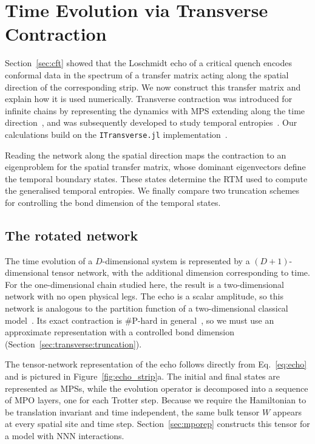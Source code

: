 \FloatBarrier
\section{Time Evolution via Transverse Contraction}
\label{sec:transverse}

Section~\ref{sec:cft} showed that the Loschmidt echo of a critical quench encodes conformal data in the spectrum of a transfer matrix acting along the spatial direction of the corresponding strip. We now construct this transfer matrix and explain how it is used numerically. Transverse contraction was introduced for infinite chains by representing the dynamics with \ac{MPS} extending along the time direction~\cite{banuls2009,muller_hermes2012}, and was subsequently developed to study temporal entropies~\cite{carignano_marimon_tagliacozzo2024,carignano_tagliacozzo2025}. Our calculations build on the \texttt{ITransverse.jl} implementation~\cite{carignano2025itransverse}.

Reading the network along the spatial direction maps the contraction to an eigenproblem for the spatial transfer matrix, whose dominant eigenvectors define the temporal boundary states. These states determine the \ac{RTM} used to compute the generalised temporal entropies. We finally compare two truncation schemes for controlling the bond dimension of the temporal states.

\subsection{The rotated network}
\label{sec:transverse:network}

The time evolution of a $D$-dimensional system is represented by a $(D{+}1)$-dimensional tensor network, with the additional dimension corresponding to time. For the one-dimensional chain studied here, the result is a two-dimensional network with no open physical legs. The echo is a scalar amplitude, so this network is analogous to the partition function of a two-dimensional classical model~\cite{fradkin2013}. Its exact contraction is \#P-hard in general~\cite{schuch2007}, so we must use an approximate representation with a controlled bond dimension (Section~\ref{sec:transverse:truncation}).

The tensor-network representation of the echo follows directly from Eq.~\eqref{eq:echo} and is pictured in Figure~\ref{fig:echo_strip}a. The initial and final states are represented as \acp{MPS}, while the evolution operator is decomposed into a sequence of \ac{MPO} layers, one for each Trotter step. Because we require the Hamiltonian to be translation invariant and time independent, the same bulk tensor $W$ appears at every spatial site and time step. Section~\ref{sec:mporep} constructs this tensor for a model with \ac{NNN} interactions.

